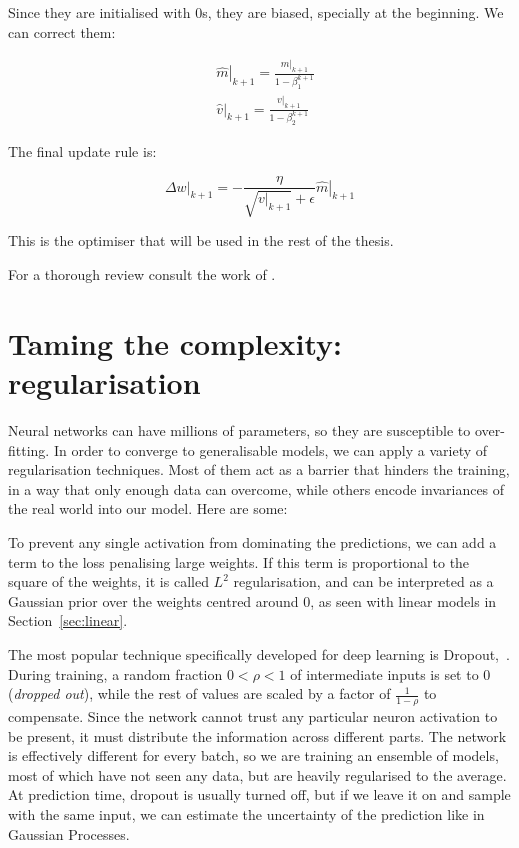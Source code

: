 Since they are initialised with 0s, they are biased, specially at the beginning. We can correct them:

\begin{align*}
	&\left.\hat{m}\right|_{k+1} = \frac{\left.m\right|_{k+1}}{1-\beta_1^{k+1}}\\
	&\left.\hat{v}\right|_{k+1} = \frac{\left.v\right|_{k+1}}{1-\beta_2^{k+1}}
\end{align*}

The final update rule is:

\begin{equation*}
\left.\Delta w\right|_{k+1} = - \frac{\eta}{\sqrt{\left.v\right|_{k+1}} + \epsilon}\left.\hat{m}\right|_{k+1}
\end{equation*} 

This is the optimiser that will be used in the rest of the thesis.


For a thorough review consult the work of \citet{optimisers_review}.


\section{Taming the complexity: regularisation}
Neural networks can have millions of parameters, so they are susceptible to over-fitting.
In order to converge to generalisable models, we can apply a variety of regularisation techniques.
Most of them act as a barrier that hinders the training, in a way that only enough data can overcome, while others encode invariances of the real world into our model.
Here are some:


To prevent any single activation from 
dominating the predictions, we can add a term to the loss penalising large weights.
If this term is proportional to the square of the weights, it is called $L^2$ regularisation, and can be interpreted as a Gaussian prior over the weights centred around $0$, as seen with linear models in Section~\ref{sec:linear}.

The most popular technique  
specifically developed for deep learning is Dropout,~\citep{dropout}. 
During training, a random fraction $0 < \rho < 1$ of intermediate inputs is set to $0$ (\emph{dropped out}), while the rest of values are scaled by a factor of $\frac{1}{1-\rho}$ to compensate.
Since the network cannot trust any particular neuron activation to be present, it must distribute the information across different parts.
The network is effectively different for every batch, so we are training an ensemble of models, most of which have not seen any data, but are heavily regularised to the average.
At prediction time, dropout is usually turned off, but if we leave it on and sample with the same input, we can estimate the uncertainty of the prediction like in Gaussian Processes.


